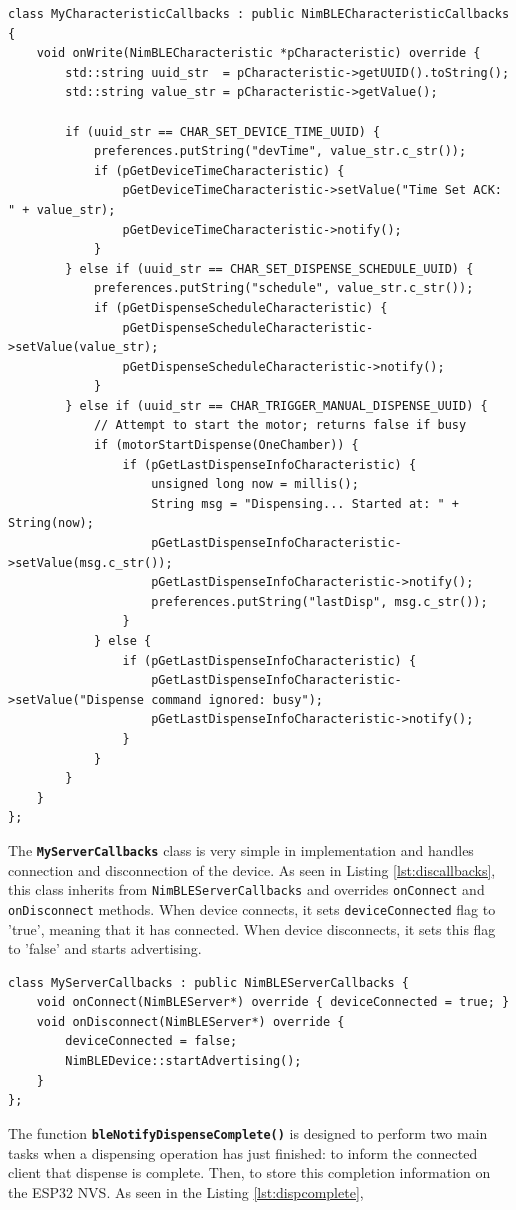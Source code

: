 \begin{lstlisting}[style=cppstyle, caption={MyCharacteristicCallbacks class responsible for handling write commands from the server}, label={lst:callbacks}]
class MyCharacteristicCallbacks : public NimBLECharacteristicCallbacks {
	void onWrite(NimBLECharacteristic *pCharacteristic) override {
		std::string uuid_str  = pCharacteristic->getUUID().toString();
		std::string value_str = pCharacteristic->getValue();
		
		if (uuid_str == CHAR_SET_DEVICE_TIME_UUID) {
			preferences.putString("devTime", value_str.c_str());
			if (pGetDeviceTimeCharacteristic) {
				pGetDeviceTimeCharacteristic->setValue("Time Set ACK: " + value_str);
				pGetDeviceTimeCharacteristic->notify();
			}
		} else if (uuid_str == CHAR_SET_DISPENSE_SCHEDULE_UUID) {
			preferences.putString("schedule", value_str.c_str());
			if (pGetDispenseScheduleCharacteristic) {
				pGetDispenseScheduleCharacteristic->setValue(value_str);
				pGetDispenseScheduleCharacteristic->notify();
			}
		} else if (uuid_str == CHAR_TRIGGER_MANUAL_DISPENSE_UUID) {
			// Attempt to start the motor; returns false if busy
			if (motorStartDispense(OneChamber)) {
				if (pGetLastDispenseInfoCharacteristic) {
					unsigned long now = millis();
					String msg = "Dispensing... Started at: " + String(now);
					pGetLastDispenseInfoCharacteristic->setValue(msg.c_str());
					pGetLastDispenseInfoCharacteristic->notify();
					preferences.putString("lastDisp", msg.c_str());
				}
			} else {
				if (pGetLastDispenseInfoCharacteristic) {
					pGetLastDispenseInfoCharacteristic->setValue("Dispense command ignored: busy");
					pGetLastDispenseInfoCharacteristic->notify();
				}
			}
		}
	}
};
\end{lstlisting}

The \texttt{\textbf{MyServerCallbacks}} class is very simple in implementation and handles connection and disconnection of the device. As seen in Listing \ref{lst:discallbacks}, this class inherits from \texttt{NimBLEServerCallbacks} and overrides \texttt{onConnect} and \texttt{onDisconnect} methods. When device connects, it sets \texttt{deviceConnected} flag to 'true', meaning that it has connected. When device disconnects, it sets this flag to 'false' and starts advertising.
\begin{lstlisting}[style=cppstyle, caption={MyServerCallbacks class responsible for device connect/disconnect}, label={lst:discallbacks}]
class MyServerCallbacks : public NimBLEServerCallbacks {
	void onConnect(NimBLEServer*) override { deviceConnected = true; }
	void onDisconnect(NimBLEServer*) override {
		deviceConnected = false;
		NimBLEDevice::startAdvertising();
	}
};
\end{lstlisting}
The function \texttt{\textbf{bleNotifyDispenseComplete()}} is designed to perform two main tasks when a dispensing operation has just finished: to inform the connected client that dispense is complete. Then, to store this completion information on the ESP32 \ac{NVS}. As seen in the Listing \ref{lst:dispcomplete},

